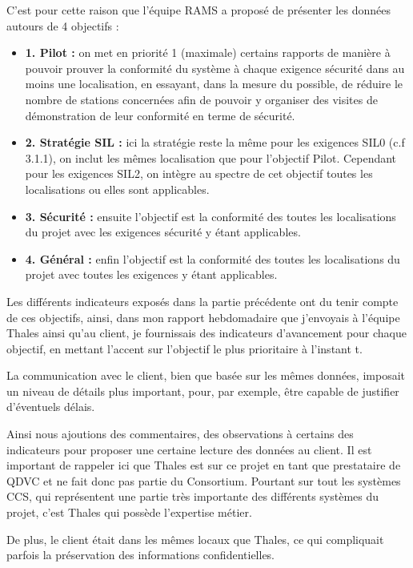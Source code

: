 C'est pour cette raison que l'équipe \gls{RAMS} a proposé de présenter les données autours de 4 objectifs :
\begin{itemize}
\item \textbf{1. Pilot :} on met en priorité 1 (maximale) certains rapports de manière à pouvoir prouver la conformité du système à chaque exigence sécurité dans au moins une localisation, en essayant, dans la mesure du possible, de réduire le nombre de stations concernées afin de pouvoir y organiser des visites de démonstration de leur conformité en terme de sécurité. 
\item \textbf{2. Stratégie SIL :} ici la stratégie reste la même pour les exigences \gls{SIL}0 (c.f 3.1.1), on inclut les mêmes localisation que pour l'objectif Pilot. Cependant pour les exigences \gls{SIL}2, on intègre au spectre de cet objectif toutes les localisations ou elles sont applicables.
\item \textbf{3. Sécurité :} ensuite l'objectif est la conformité des toutes les localisations du projet avec les exigences sécurité y étant applicables.
\item \textbf{4. Général :} enfin l'objectif est la conformité des toutes les localisations du projet avec toutes les exigences y étant applicables.
\end{itemize}


Les différents indicateurs exposés dans la partie précédente ont du tenir compte de ces objectifs, ainsi, dans mon rapport hebdomadaire que j'envoyais à l'équipe Thales ainsi qu'au client, je fournissais des indicateurs d'avancement pour chaque objectif, en mettant l'accent sur l'objectif le plus prioritaire à l'instant t.


La communication avec le client, bien que basée sur les mêmes données, imposait un niveau de détails plus important, pour, par exemple, être capable de justifier d'éventuels délais.

Ainsi nous ajoutions des commentaires, des observations à certains des indicateurs pour proposer une certaine lecture des données au client. 
Il est important de rappeler ici que Thales est sur ce projet en tant que prestataire de QDVC et ne fait donc pas partie du Consortium.
Pourtant sur tout les systèmes \gls{CCS}, qui représentent une partie très importante des différents systèmes du projet, c'est Thales qui possède l'expertise métier. 

De plus, le client était dans les mêmes locaux que Thales, ce qui compliquait parfois la préservation des informations confidentielles. 

